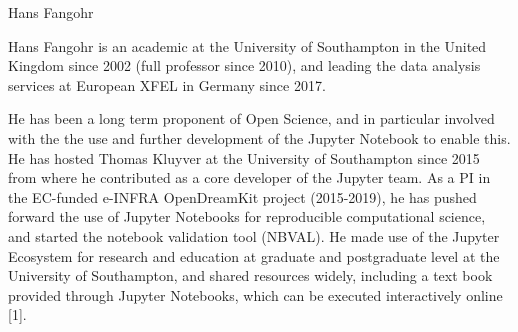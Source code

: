 \begin{participant}[type=leadPI,PM=5,gender=male]{Hans Fangohr}








  \medskip Hans Fangohr is an academic at the University
  of Southampton in the United Kingdom since 2002 (full professor
  since 2010), and leading the data analysis services at European XFEL
  in Germany since 2017.


  He has been a long term proponent of Open Science, and in particular
  involved with the the use and further development of the Jupyter
  Notebook to enable this. He has hosted Thomas Kluyver at the
  University of Southampton since 2015 from where he contributed as a
  core developer of the Jupyter team. As a PI in the EC-funded e-INFRA
  OpenDreamKit project (2015-2019), he has pushed forward the use of
  Jupyter Notebooks for reproducible computational science, and
  started the notebook validation tool (NBVAL). He made use of the
  Jupyter Ecosystem for research and education at graduate and
  postgraduate level at the University of Southampton, and shared
  resources widely, including a text book provided through Jupyter
  Notebooks, which can be executed interactively online [1].


\end{participant}
